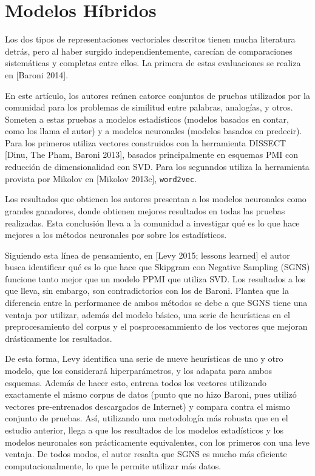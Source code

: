 \section{Modelos Híbridos}

Los dos tipos de representaciones vectoriales descritos tienen mucha literatura detrás, pero al
haber surgido independientemente, carecían de comparaciones sistemáticas y completas entre ellos. La
primera de estas evaluaciones se realiza en [Baroni 2014].

En este artículo, los autores reúnen catorce conjuntos de pruebas utilizados por la comunidad para
los problemas de similitud entre palabras, analogías, y otros. Someten a estas pruebas a modelos
estadísticos (modelos basados en contar, como los llama el autor) y a modelos neuronales (modelos
basados en predecir). Para los primeros utiliza vectores construidos con la herramienta DISSECT
[Dinu, The Pham, Baroni 2013], basados principalmente en esquemas PMI con reducción de
dimensionalidad con SVD\@. Para los segunndos utiliza la herramienta provista por Mikolov en
[Mikolov 2013c], \texttt{word2vec}.

Los resultados que obtienen los autores presentan a los modelos neuronales como grandes ganadores,
donde obtienen mejores resultados en todas las pruebas realizadas. Esta conclusión lleva a la
comunidad a investigar qué es lo que hace mejores a los métodos neuronales por sobre los
estadísticos.

Siguiendo esta línea de pensamiento, en [Levy 2015; lessons learned] el autor busca identificar qué
es lo que hace que Skipgram con Negative Sampling (SGNS) funcione tanto mejor que un modelo PPMI que
utiliza SVD\@. Los resultados a los que lleva, sin embargo, son contradictorios con los de
Baroni. Plantea que la diferencia entre la performance de ambos métodos se debe a que SGNS tiene una
ventaja por utilizar, además del modelo básico, una serie de heurísticas en el preprocesamiento del
corpus y el posprocesammiento de los vectores que mejoran drásticamente los resultados.

De esta forma, Levy identifica una serie de nueve heurísticas de uno y otro modelo, que los
considerará hiperparámetros, y los adapata para ambos esquemas. Además de hacer esto, entrena todos
los vectores utilizando exactamente el mismo corpus de datos (punto que no hizo Baroni, pues utilizó
vectores pre-entrenados descargados de Internet) y compara contra el mismo conjunto de pruebas. Así,
utilizando una metodología más robusta que en el estudio anterior, llega a que los resultados de los
modelos estadísticos y los modelos neuronales son prácticamente equivalentes, con los primeros con
una leve ventaja. De todos modos, el autor resalta que SGNS es mucho más eficiente
computacionalmente, lo que le permite utilizar más datos.



